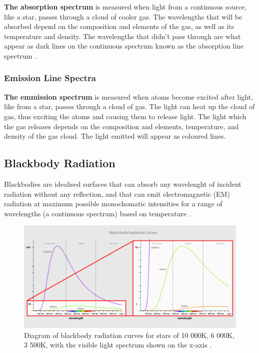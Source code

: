 \documentclass[12pt]{article}
\begin{document}
\textbf{The absorption spectrum} is measured when light from a continuous source, like a star, passes through a cloud of cooler gas.
The wavelengths that will be absorbed depend on the composition and elements of the gas, as well as its temperature and density. The wavelengths
that didn't pass through are what appear as dark lines on the continuous spectrum known as the absorption line spectrum \cite{cosmosabsorp}.

\subsubsection{Emission Line Spectra}

\textbf{The emmission spectrum} is measured when atoms become excited after light, like from a star, passes through a cloud of gas.
The light can heat up the cloud of gas, thus exciting the atoms and causing them to release light. The light which the gas releases depends on the
composition and elements, temperature, and density of the gas cloud. The light emitted will appear as coloured lines.

\subsection{Blackbody Radiation} \label{sec:1.1}

Blackbodies are idealised surfaces that can absorb any wavelenght of incident radiation without any reflection, and that can emit electromagnetic (EM) radiation
at maximum possible monochomatic intensities for a range of wavelengths (a continuous spectrum) based on temperature
\cite{librablackodyrad,UCDblackbocdyrad,ESAblackbodyrad}.

\begin{figure}[H]
    \centering
    \includegraphics[width=12.5cm]{blackbody.jpg}
    \caption{\centering Diagram of blackbody radiation curves for stars of 10 000K, 6 000K, 3 500K, with the visible light spectrum shown on the x-axis \protect\cite{ESAblackbodyrad}.}
    \label{fig:blackbodyrad}
\end{figure}
\end{document}
